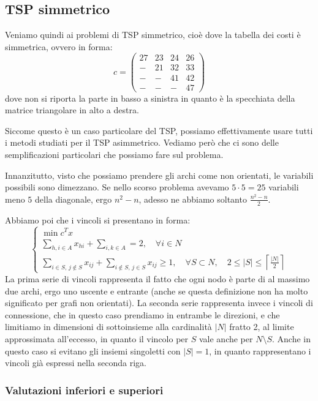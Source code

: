 \documentclass[a4paper,11pt]{article}
\begin{document}
\subsection{TSP simmetrico}
Veniamo quindi ai problemi di TSP simmetrico, cioè dove la tabella dei costi è simmetrica, ovvero in forma:
$$
c =
\begin{pmatrix}
	27 & 23 & 24 & 26 \\ 
	- & 21 & 32 & 33 \\ 
	- & - & 41 & 42 \\ 
	- & - & - & 47
\end{pmatrix}
$$
dove non si riporta la parte in basso a sinistra in quanto è la specchiata della matrice triangolare in alto a destra.

Siccome questo è un caso particolare del TSP, possiamo effettivamente usare tutti i metodi studiati per il TSP asimmetrico.
Vediamo però che ci sono delle semplificazioni particolari che possiamo fare sul problema.

Innanzitutto, visto che possiamo prendere gli archi come non orientati, le variabili possibili sono dimezzano.
Se nello scorso problema avevamo $5 \cdot 5 = 25$ variabili meno $5$ della diagonale, ergo $n^2 - n$, adesso ne abbiamo soltanto $\frac{n^2 - n}{2}$. 

Abbiamo poi che i vincoli si presentano in forma:
\[
	\begin{cases}
		\min c^T x \\ 
		\sum\limits_{h,i \in A} x_{hi} + \sum\limits_{i,k \in A} = 2, \quad \forall i \in N \\
		\sum\limits_{i \in S, \, j \notin S} x_{ij} + \sum\limits_{i \notin S, \, j \in S} x_{ij} \geq 1, \quad \forall S \subset N, \quad 2 \leq |S| \leq \left\lceil \frac{|N|}{2} \right\rceil
	\end{cases}
\]
La prima serie di vincoli rappresenta il fatto che ogni nodo è parte di al massimo due archi, ergo uno uscente e entrante (anche se questa definizione non ha molto significato per grafi non orientati). 
La seconda serie rappresenta invece i vincoli di connessione, che in questo caso prendiamo in entrambe le direzioni, e che limitiamo in dimensioni di sottoinsieme alla cardinalità $|N|$ fratto 2, al limite approssimata all'eccesso, in quanto il vincolo per $S$ vale anche per $N \setminus S$. 
Anche in questo caso si evitano gli insiemi singoletti con $|S| = 1$, in quanto rappresentano i vincoli già espressi nella seconda riga.

\subsubsection{Valutazioni inferiori e superiori}
\end{document}
